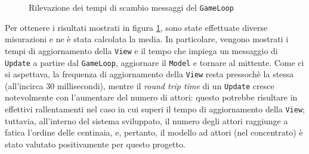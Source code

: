 \begin{figure}[H]
    \centering
    \caption{Rilevazione dei tempi di scambio messaggi del \texttt{GameLoop}
    \label{fig:performance-evaluation}}
\end{figure}

Per ottenere i risultati mostrati in figura \ref{fig:performance-evaluation}, sono state effettuate diverse misurazioni
e ne è stata calcolata la media. In particolare, vengono mostrati i tempi di aggiornamento della \texttt{View} e il
tempo che impiega un messaggio di \texttt{Update} a partire dal \texttt{GameLoop}, aggiornare il \texttt{Model} e
tornare al mittente. Come ci si aspettava, la frequenza di aggiornamento della \texttt{View} resta pressochè la stessa
(all'incirca 30 millisecondi), mentre il \textit{round trip time} di un \texttt{Update} cresce notevolmente con
l'aumentare del numero di attori: questo potrebbe risultare in effettivi rallentamenti nel caso in cui superi il tempo
di aggiornamento della \texttt{View}; tuttavia, all'interno del sistema sviluppato, il numero degli attori raggiunge a
fatica l'ordine delle centinaia, e, pertanto, il modello ad attori (nel concentrato) è stato valutato positivamente per
questo progetto.
